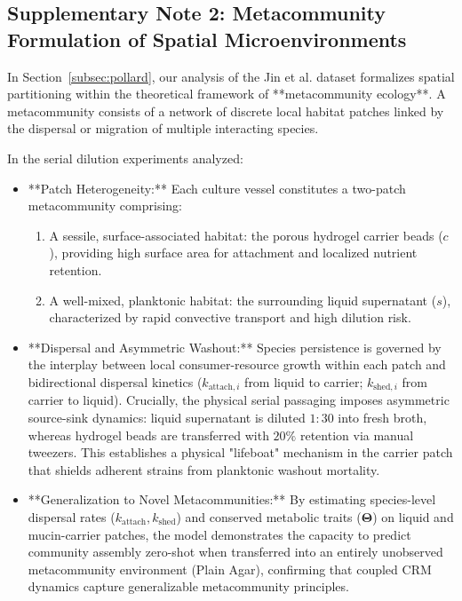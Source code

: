 \subsection*{Supplementary Note 2: Metacommunity Formulation of Spatial Microenvironments}
\label{note:metacommunity}

In Section~\ref{subsec:pollard}, our analysis of the Jin et al. dataset formalizes spatial partitioning within the theoretical framework of **metacommunity ecology**. A metacommunity consists of a network of discrete local habitat patches linked by the dispersal or migration of multiple interacting species. 

In the serial dilution experiments analyzed:
\begin{itemize}
    \item **Patch Heterogeneity:** Each culture vessel constitutes a two-patch metacommunity comprising:
    \begin{enumerate}
        \item A sessile, surface-associated habitat: the porous hydrogel carrier beads ($c$), providing high surface area for attachment and localized nutrient retention.
        \item A well-mixed, planktonic habitat: the surrounding liquid supernatant ($s$), characterized by rapid convective transport and high dilution risk.
    \end{enumerate}
    \item **Dispersal and Asymmetric Washout:** Species persistence is governed by the interplay between local consumer-resource growth within each patch and bidirectional dispersal kinetics ($k_{\text{attach}, i}$ from liquid to carrier; $k_{\text{shed}, i}$ from carrier to liquid). Crucially, the physical serial passaging imposes asymmetric source-sink dynamics: liquid supernatant is diluted $1:30$ into fresh broth, whereas hydrogel beads are transferred with $20\%$ retention via manual tweezers. This establishes a physical "lifeboat" mechanism in the carrier patch that shields adherent strains from planktonic washout mortality.
    \item **Generalization to Novel Metacommunities:** By estimating species-level dispersal rates ($k_{\text{attach}}, k_{\text{shed}}$) and conserved metabolic traits ($\mathbf{\Theta}$) on liquid and mucin-carrier patches, the model demonstrates the capacity to predict community assembly zero-shot when transferred into an entirely unobserved metacommunity environment (Plain Agar), confirming that coupled CRM dynamics capture generalizable metacommunity principles.
\end{itemize}


